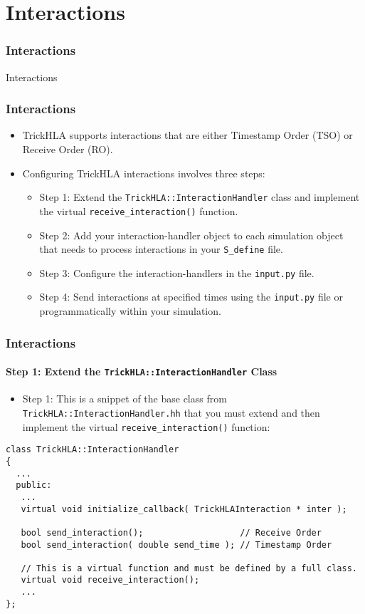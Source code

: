   
   \section{Interactions}

   \begin{frame}
      \frametitle{Interactions}
      \begin{center}
      \Huge{Interactions}
      \end{center}
   \end{frame}
   
   \begin{frame}
      \frametitle{Interactions}
      \begin{itemize}
         \item TrickHLA supports interactions that are either Timestamp Order
         (TSO) or Receive Order (RO).
         \item Configuring TrickHLA interactions involves three steps:
         \begin{itemize}
            \item Step 1: Extend the \texttt{TrickHLA::InteractionHandler} class
            and implement the virtual \texttt{receive\_interaction()} function.
            \item Step 2: Add your interaction-handler object to each simulation
            object that needs to process interactions in your \texttt{S\_define} file.
            \item Step 3: Configure the interaction-handlers in the \texttt{input.py} file.
            \item Step 4: Send interactions at specified times using the
            \texttt{input.py} file or programmatically within your simulation.
         \end{itemize}
      \end{itemize}
   \end{frame}
   
   \begin{frame}[fragile]
      \frametitle{Interactions}
      \framesubtitle{Step 1: Extend the \texttt{TrickHLA::InteractionHandler} Class}
      \begin{itemize}
         \item Step 1: This is a snippet of the base class from
         \texttt{TrickHLA::InteractionHandler.hh} that you must extend and then
         implement the virtual \texttt{receive\_interaction()} function:
      \end{itemize}
\begin{Verbatim}[frame=single, fontsize=\scriptsize]
class TrickHLA::InteractionHandler
{
  ...
  public:
   ...
   virtual void initialize_callback( TrickHLAInteraction * inter );

   bool send_interaction();                   // Receive Order
   bool send_interaction( double send_time ); // Timestamp Order

   // This is a virtual function and must be defined by a full class.
   virtual void receive_interaction();
   ...
};
\end{Verbatim}
   \end{frame}

